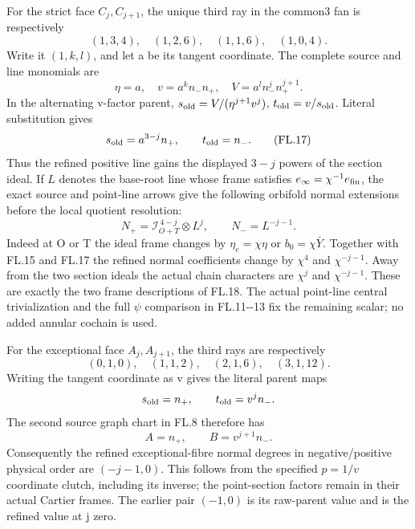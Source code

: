 For the strict face \(C_j,C_{j+1}\), the unique third
ray in the common3 fan is respectively
\[
 (1,3,4),\quad(1,2,6),\quad(1,1,6),\quad(1,0,4).
 \tag{FL.16}
\]
Write it \((1,k,l)\), and let a be its tangent
coordinate. The complete source and line monomials are
\[
 \eta=a,\quad v=a^k n_-n_+,\quad
 V=a^l n_-^j n_+^{j+1}.
\]
In the alternating v-factor parent,
\(s_{\rm old}=V/(\eta^{j+1}v^j)\),
\(t_{\rm old}=v/s_{\rm old}\). Literal substitution gives
\[
 s_{\rm old}=a^{3-j}n_+,\qquad
 t_{\rm old}=n_-.
 \tag{FL.17}
\]
Thus the refined positive line gains the displayed
\(3-j\) powers of the section ideal. If \(L\) denotes
the base-root line whose frame satisfies
\(e_\infty=\chi^{-1}e_{\rm fin}\), the exact source
and point-line arrows give the following orbifold
normal extensions before the local quotient resolution:
\[
 N_+=\mathcal I_{O+T}^{\,4-j}\otimes L^j,
 \qquad N_-=L^{-j-1}.
 \tag{FL.18}
\]
Indeed at O or T the ideal frame changes by
\(\eta_e=\chi\eta\) or \(b_0=\chi\bar Y\).
Together with FL.15 and FL.17 the refined normal
coefficients change by \(\chi^4\) and
\(\chi^{-j-1}\). Away from the two section ideals
the actual chain characters are \(\chi^j\) and
\(\chi^{-j-1}\). These are exactly the two frame
descriptions of FL.18. The actual point-line central
trivialization and the full \(\psi\) comparison in
FL.11-\/-13 fix the remaining scalar; no added annular
cochain is used.

For the exceptional face \(A_j,A_{j+1}\), the third
rays are respectively
\[
 (0,1,0),\quad(1,1,2),\quad(2,1,6),\quad(3,1,12).
 \tag{FL.19}
\]
Writing the tangent coordinate as v gives the
literal parent maps
\[
 s_{\rm old}=n_+,\qquad t_{\rm old}=v^j n_-.
\]
The second source graph chart in FL.8 therefore has
\[
 A=n_+,\qquad B=v^{j+1}n_-.
 \tag{FL.20}
\]
Consequently the refined exceptional-fibre normal
degrees in negative/positive physical order are
\((-j-1,0)\). This follows from the specified
\(p=1/v\) coordinate clutch, including its inverse;
the point-section factors remain in their actual
Cartier frames. The earlier pair \((-1,0)\)
is its raw-parent value and is the refined value
at j zero.

